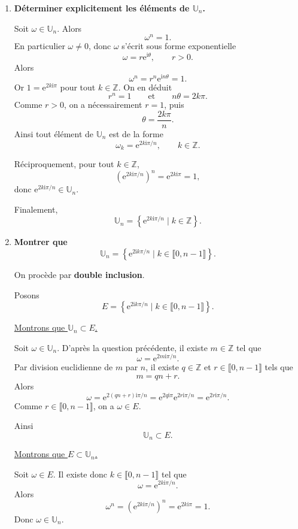 \documentclass[11pt,a4paper]{article}
\newcommand{\U}{\mathbb{U}}
\newcommand{\ii}{\mathrm{i}}
\newcommand{\e}{\mathrm{e}}
\begin{document}
\begin{enumerate}[label=\textbf{A.\arabic*.}]
    \item \textbf{Déterminer explicitement les éléments de \(\U_n\).}

    Soit \(\omega\in\U_n\). Alors
    \[
    \omega^n=1.
    \]
    En particulier \(\omega\neq 0\), donc \(\omega\) s’écrit sous forme exponentielle
    \[
    \omega=r\e^{\ii\theta},\qquad r>0.
    \]
    Alors
    \[
    \omega^n=r^n\e^{\ii n\theta}=1.
    \]
    Or \(1=\e^{2k\ii\pi}\) pour tout \(k\in\mathbb{Z}\). On en déduit
    \[
    r^n=1
    \qquad\text{et}\qquad
    n\theta=2k\pi.
    \]
    Comme \(r>0\), on a nécessairement \(r=1\), puis
    \[
    \theta=\frac{2k\pi}{n}.
    \]
    Ainsi tout élément de \(\U_n\) est de la forme
    \[
    \omega_k=\e^{2k\ii\pi/n},\qquad k\in\mathbb{Z}.
    \]

    Réciproquement, pour tout \(k\in\mathbb{Z}\),
    \[
    \left(\e^{2k\ii\pi/n}\right)^n=\e^{2k\ii\pi}=1,
    \]
    donc \(\e^{2k\ii\pi/n}\in\U_n\).

    Finalement,
    \[
    \boxed{\U_n=\left\{\e^{2k\ii\pi/n}\mid k\in\mathbb{Z}\right\}.}
    \]

    \item \textbf{Montrer que
    \[
    \U_n=\left\{\e^{2\ii k\pi/n}\mid k\in\llbracket 0,n-1\rrbracket\right\}.
    \]}

    On procède par \textbf{double inclusion}.

    Posons
    \[
    E=\left\{\e^{2\ii k\pi/n}\mid k\in\llbracket 0,n-1\rrbracket\right\}.
    \]

    \underline{Montrons que \(\U_n\subset E\).}

    Soit \(\omega\in\U_n\). D’après la question précédente, il existe \(m\in\mathbb{Z}\) tel que
    \[
    \omega=\e^{2m\ii\pi/n}.
    \]
    Par division euclidienne de \(m\) par \(n\), il existe \(q\in\mathbb{Z}\) et \(r\in\llbracket 0,n-1\rrbracket\) tels que
    \[
    m=qn+r.
    \]
    Alors
    \[
    \omega=\e^{2(qn+r)\ii\pi/n}
    =\e^{2q\ii\pi}\e^{2r\ii\pi/n}
    =\e^{2r\ii\pi/n}.
    \]
    Comme \(r\in\llbracket 0,n-1\rrbracket\), on a \(\omega\in E\).

    Ainsi
    \[
    \U_n\subset E.
    \]

    \underline{Montrons que \(E\subset \U_n\).}

    Soit \(\omega\in E\). Il existe donc \(k\in\llbracket 0,n-1\rrbracket\) tel que
    \[
    \omega=\e^{2k\ii\pi/n}.
    \]
    Alors
    \[
    \omega^n=\left(\e^{2k\ii\pi/n}\right)^n=\e^{2k\ii\pi}=1.
    \]
    Donc \(\omega\in\U_n\).


\end{enumerate}
\end{document}
